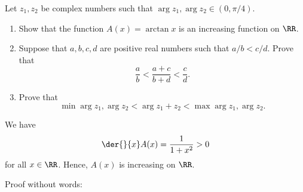 \begin{problem}
    Let $z_1, z_2$ be complex numbers such that $\arg{z_1}, \arg{z_2} \in (0, \pi/4)$.

    \begin{enumerate}
        \item Show that the function $A(x) = \arctan x$ is an increasing function on $\RR$.
        \item Suppose that $a, b, c, d$ are positive real numbers such that $a/b < c/d$. Prove that \[\frac{a}{b} < \frac{a + c}{b + d} < \frac{c}{d}.\]
        \item Prove that \[\min{\arg{z_1}, \arg{z_2}} < \arg{z_1 + z_2} < \max{\arg{z_1}, \arg{z_2}}.\]
    \end{enumerate}
\end{problem}
\begin{solution}
    \begin{ppart}
        We have \[\der{}{x} A(x) = \frac{1}{1 + x^2} > 0\] for all $x \in \RR$. Hence, $A(x)$ is increasing on $\RR$.
    \end{ppart}
    \begin{ppart}
        Proof without words:
        \begin{center}
\end{center}
\end{ppart}
\end{solution}
